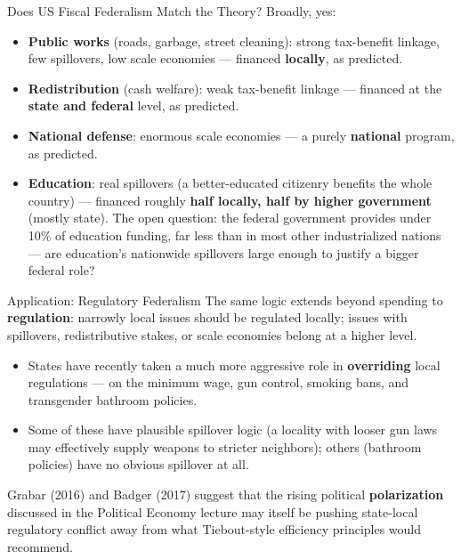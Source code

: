 \documentclass[11pt,aspectratio=169]{beamer}
\begin{document}
\begin{frame}{Does US Fiscal Federalism Match the Theory?}
  \small Broadly, yes:
  \begin{itemize}
    \item \textbf{Public works} (roads, garbage, street cleaning): strong tax-benefit linkage, few spillovers, low scale economies --- financed \textbf{locally}, as predicted.
    \item \textbf{Redistribution} (cash welfare): weak tax-benefit linkage --- financed at the \textbf{state and federal} level, as predicted.
    \item \textbf{National defense}: enormous scale economies --- a purely \textbf{national} program, as predicted.
    \item \textbf{Education}: real spillovers (a better-educated citizenry benefits the whole country) --- financed roughly \textbf{half locally, half by higher government} (mostly state). The open question: the federal government provides under 10\% of education funding, far less than in most other industrialized nations --- are education's nationwide spillovers large enough to justify a bigger federal role?
  \end{itemize}
\end{frame}

\begin{frame}{Application: Regulatory Federalism}
  The same logic extends beyond spending to \textbf{regulation}: narrowly local issues should be regulated locally; issues with spillovers, redistributive stakes, or scale economies belong at a higher level.
  \begin{itemize}
    \item States have recently taken a much more aggressive role in \textbf{overriding} local regulations --- on the minimum wage, gun control, smoking bans, and transgender bathroom policies.
    \item Some of these have plausible spillover logic (a locality with looser gun laws may effectively supply weapons to stricter neighbors); others (bathroom policies) have no obvious spillover at all.
  \end{itemize}
  \small Grabar (2016) and Badger (2017) suggest that the rising political \textbf{polarization} discussed in the Political Economy lecture may itself be pushing state-local regulatory conflict away from what Tiebout-style efficiency principles would recommend.
\end{frame}

\end{document}
